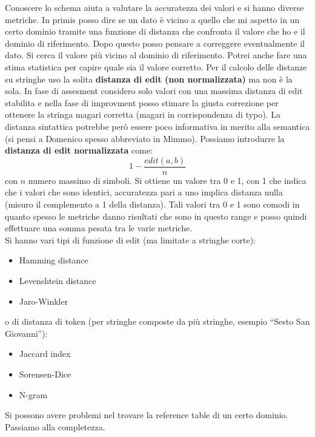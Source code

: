 \documentclass[a4paper,12pt, oneside]{book}
\begin{document}
Conoscere lo schema aiuta a valutare la accuratezza dei valori e si hanno
diverse metriche. In primis posso dire se un dato è vicino a quello che mi
aspetto in un certo dominio tramite una funzione di distanza che confronta il
valore che ho e il dominio di riferimento. Dopo questo posso pensare a
correggere eventualmente il dato. Si cerca il valore più vicino al dominio di
riferimento. Potrei anche fare una stima statistica per capire quale sia il
valore corretto. Per il calcolo delle distanze su stringhe uso la solita
\textbf{distanza di edit (non normalizzata)} ma non è la sola. In fase di
assesment considero solo 
valori con una massima distanza di edit stabilita e nella fase di improvment
posso stimare la giusta correzione per ottenere la stringa magari corretta
(magari in corrispondenza di typo). La distanza sintattica potrebbe però essere
poco informativa in merito alla semantica (si pensi a Domenico spesso abbreviato
in Mimmo). Possiamo introdurre la \textbf{distanza di edit normalizzata} come:
\[1-\frac{edit(a,b)}{n}\]
con $n$ numero massimo di simboli. Si ottiene un valore tra 0 e 1, con 1 che
indica che i valori che sono identici, accuratezza pari a uno implica distanza
nulla (misuro il complemento a 1 della distanza). Tali valori tra 0 e 1 sono
comodi in 
quanto spesso le metriche danno risultati che sono in questo range e posso
quindi effettuare una somma pesata tra le varie metriche.\\
Si hanno vari tipi di funzione di edit (ma limitate a stringhe corte):
\begin{itemize}
  \item Hamming distance
  \item Levenshtein distance
  \item Jaro-Winkler
\end{itemize}
o di distanza di token (per stringhe composte da più stringhe, esempio ``Sesto
San Giovanni''):
\begin{itemize}
  \item Jaccard index
  \item Sorensen-Dice
  \item N-gram
\end{itemize}
Si possono avere problemi nel trovare la reference table di un certo dominio. \\
Passiamo alla completezza.
\end{document}
